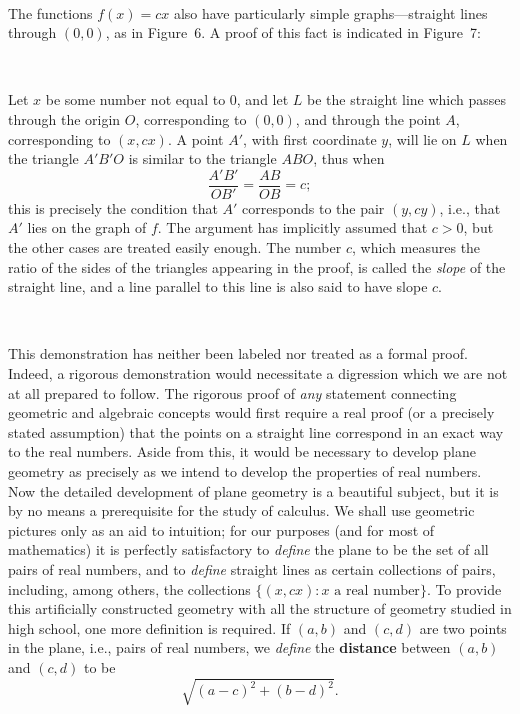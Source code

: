 \begin{center}
\\[0.6em]
\end{center}

The functions $f(x)=cx$ also have particularly simple graphs---straight lines
through $(0,0)$, as in Figure~6. A proof of this fact is indicated in
Figure~7:

\begin{center}
\\[0.6em]
\end{center}

Let $x$ be some number not equal to $0$, and let $L$ be the straight line which
passes through the origin $O$, corresponding to $(0,0)$, and through the
point $A$, corresponding to $(x,cx)$. A point $A'$, with first coordinate $y$,
will lie on $L$ when the triangle $A'B'O$ is similar to the triangle $ABO$,
thus when
\[
\frac{A'B'}{OB'}=\frac{AB}{OB}=c;
\]
this is precisely the condition that $A'$ corresponds to the pair $(y,cy)$,
i.e., that $A'$ lies on the graph of $f$. The argument has implicitly assumed
that $c>0$, but the other cases are treated easily enough. The number $c$,
which measures the ratio of the sides of the triangles appearing in the proof,
is called the \emph{slope} of the straight line, and a line parallel to this
line is also said to have slope $c$.

\begin{center}
\\[0.6em]
\end{center}

This demonstration has neither been labeled nor treated as a formal proof.
Indeed, a rigorous demonstration would necessitate a digression which we are
not at all prepared to follow. The rigorous proof of \emph{any} statement
connecting geometric and algebraic concepts would first require a real proof
(or a precisely stated assumption) that the points on a straight line
correspond in an exact way to the real numbers. Aside from this, it would be
necessary to develop plane geometry as precisely as we intend to develop the
properties of real numbers. Now the detailed development of plane geometry is
a beautiful subject, but it is by no means a prerequisite for the study of
calculus. We shall use geometric pictures only as an aid to intuition; for our
purposes (and for most of mathematics) it is perfectly satisfactory to
\emph{define} the plane to be the set of all pairs of real numbers, and to
\emph{define} straight lines as certain collections of pairs, including, among
others, the collections $\{(x,cx):x\text{ a real number}\}$. To provide this
artificially constructed geometry with all the structure of geometry studied
in high school, one more definition is required. If $(a,b)$ and $(c,d)$ are two
points in the plane, i.e., pairs of real numbers, we \emph{define} the
\textbf{distance} between $(a,b)$ and $(c,d)$ to be
\[
\sqrt{(a-c)^2+(b-d)^2}.
\]

